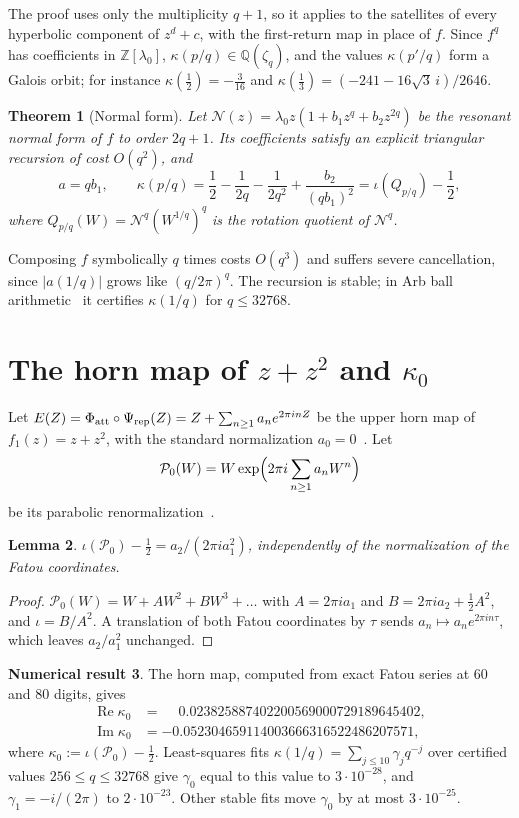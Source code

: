 \documentclass[11pt]{amsart}
\newtheorem{theorem}{Theorem}[section]
\newtheorem{lemma}[theorem]{Lemma}
\theoremstyle{definition}
\newtheorem{observation}[theorem]{Numerical result}
\theoremstyle{remark}
\newcommand{\Z}{\mathbb{Z}}
\newcommand{\Q}{\mathbb{Q}}
\newcommand{\PP}{\mathcal{P}_0}
\newcommand{\NF}{\mathcal{N}}
\begin{document}
The proof uses only the multiplicity $q+1$, so it applies to the satellites of every hyperbolic component of $z^d+c$, with the first-return map in place of $f$. Since $f^q$ has coefficients in $\Z[\lambda_0]$, $\kappa(p/q)\in\Q(\zeta_q)$, and the values $\kappa(p'/q)$ form a Galois orbit; for instance $\kappa(\frac12)=-\frac3{16}$ and $\kappa(\frac13)=(-241-16\sqrt3\,i)/2646$.

\begin{theorem}[Normal form]\label{thm:nf}
Let $\NF(z)=\lambda_0z(1+b_1z^q+b_2z^{2q})$ be the resonant normal form of $f$ to order $2q+1$. Its coefficients satisfy an explicit triangular recursion of cost $O(q^2)$, and
\[
a=qb_1,\qquad\kappa(p/q)=\frac12-\frac1{2q}-\frac1{2q^2}+\frac{b_2}{(qb_1)^2}=\iota(Q_{p/q})-\frac12,
\]
where $Q_{p/q}(W)=\NF^q(W^{1/q})^q$ is the rotation quotient of $\NF^q$.
\end{theorem}

Composing $f$ symbolically $q$ times costs $O(q^3)$ and suffers severe cancellation, since $|a(1/q)|$ grows like $(q/2\pi)^q$. The recursion is stable; in Arb ball arithmetic~\cite{Arb} it certifies $\kappa(1/q)$ for $q\le32768$.

\section{The horn map of $z+z^2$ and $\kappa_0$}\label{sec:horn}
Let $E(Z)=\Phi_{\rm att}\circ\Psi_{\rm rep}(Z)=Z+\sum_{n\ge1}a_ne^{2\pi inZ}$ be the upper horn map of $f_1(z)=z+z^2$, with the standard normalization $a_0=0$~\cite{Lavaurs,Sh}. Let
\[
\PP(W)=W\exp\Bigl(2\pi i\sum_{n\ge1}a_nW^n\Bigr)
\]
be its parabolic renormalization~\cite{IS,LY}.

\begin{lemma}\label{lem:hornindex}
$\iota(\PP)-\frac12=a_2/(2\pi ia_1^2)$, independently of the normalization of the Fatou coordinates.
\end{lemma}

\begin{proof}
$\PP(W)=W+AW^2+BW^3+\dots$ with $A=2\pi ia_1$ and $B=2\pi ia_2+\frac12A^2$, and $\iota=B/A^2$. A translation of both Fatou coordinates by $\tau$ sends $a_n\mapsto a_ne^{2\pi in\tau}$, which leaves $a_2/a_1^2$ unchanged.
\end{proof}

\begin{observation}\label{obs:kappa0}
The horn map, computed from exact Fatou series at $60$ and $80$ digits, gives
\begin{align*}
\operatorname{Re}\kappa_0&=\phantom{-}0.023825887402200569000729189645402,\\
\operatorname{Im}\kappa_0&=-0.052304659114003666316522486207571,
\end{align*}
where $\kappa_0:=\iota(\PP)-\frac12$.
Least-squares fits $\kappa(1/q)=\sum_{j\le10}\gamma_jq^{-j}$ over certified values $256\le q\le32768$ give $\gamma_0$ equal to this value to $3\cdot10^{-28}$, and $\gamma_1=-i/(2\pi)$ to $2\cdot10^{-23}$. Other stable fits move $\gamma_0$ by at most $3\cdot10^{-25}$.
\end{observation}
\end{document}
